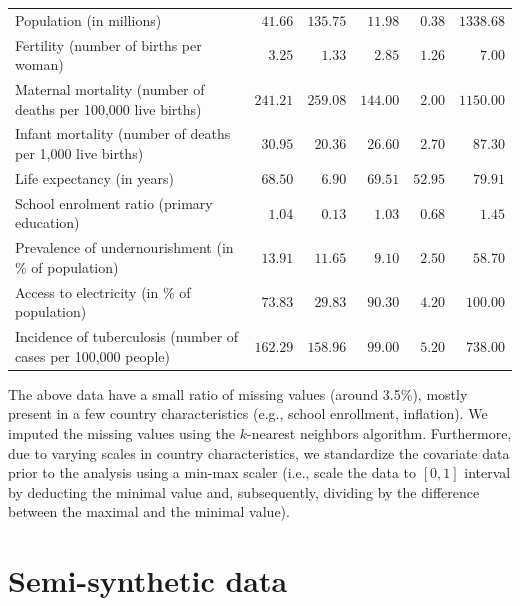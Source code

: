 \documentclass[sigconf]{acmart}
\begin{document}
\begin{table}[h]
\begin{center}
{\begin{tabular}{l rrrrr}
\thinmuskip Population (in millions)  & $41.66$ & $135.75$ & $11.98$ & $0.38$ &  $1338.68$\\
\thinmuskip Fertility (number of births per woman)  & $3.25$ & $1.33$ & $2.85$ & $1.26$ & $7.00$ \\
\thinmuskip Maternal mortality (number of deaths per 100,000 live births)  & $241.21$ & $259.08$ & $144.00$ & $2.00$ & $1150.00$ \\
\thinmuskip Infant mortality (number of deaths per 1,000 live births)  & $30.95$ & $20.36$ & $26.60$ & $2.70$ &  $87.30$\\
\thinmuskip Life expectancy (in years)  & $68.50$ & $6.90$ & $69.51$ & $52.95$ & $79.91$ \\
\thinmuskip School enrolment ratio (primary education)  & $1.04$ & $0.13$ & $1.03$ & $0.68$ & $1.45$ \\
\thinmuskip Prevalence of undernourishment (in \% of population)  & $13.91$ & $11.65$ & $9.10$ & $2.50$ & $58.70$ \\
\thinmuskip Access to electricity (in \% of population)  & $73.83$ & $29.83$ & $90.30$ & $4.20$ & $100.00$\\
\thinmuskip Incidence of tuberculosis (number of cases per 100,000 people)  & $162.29$ & $158.96$ & $99.00$ & $5.20$ & $738.00$\\
\hline \hline
\end{tabular}
}
\end{center}
\end{table}
The above data have a small ratio of missing values (around 3.5\%), mostly present in a few country characteristics (e.g., school enrollment, inflation). We imputed the missing values using the $k$-nearest neighbors algorithm. Furthermore, due to varying scales in country characteristics, we standardize the covariate data prior to the analysis using a min-max scaler (i.e., scale the data to $[0, 1]$ interval by deducting the minimal value and, subsequently, dividing by the difference between the maximal and the minimal value). 

\section{Semi-synthetic data}
\label{supp:semisynthetic_data}

\end{document}

